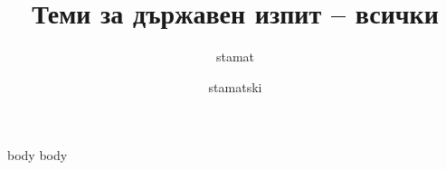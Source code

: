 \documentclass[bulgarian,a4paper,titlepage]{report}
\title{Теми за държавен изпит -- всички}
\author{stamat}
\date{stamatski}
\begin{document}
\maketitle
\tableofcontents

{body}
{body}
\end{document}
